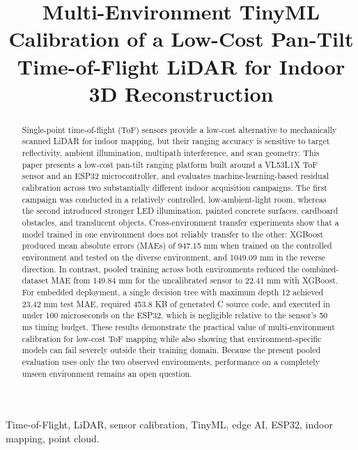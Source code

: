 \documentclass[conference, a4paper]{IEEEtran}
\begin{document}
\title{Multi-Environment TinyML Calibration of a Low-Cost Pan-Tilt Time-of-Flight LiDAR for Indoor 3D Reconstruction}

\author{
}

\maketitle

\begin{abstract}
Single-point time-of-flight (ToF) sensors provide a low-cost alternative to mechanically scanned LiDAR for indoor mapping, but their ranging accuracy is sensitive to target reflectivity, ambient illumination, multipath interference, and scan geometry. This paper presents a low-cost pan-tilt ranging platform built around a VL53L1X ToF sensor and an ESP32 microcontroller, and evaluates machine-learning-based residual calibration across two substantially different indoor acquisition campaigns. The first campaign was conducted in a relatively controlled, low-ambient-light room, whereas the second introduced stronger LED illumination, painted concrete surfaces, cardboard obstacles, and translucent objects. Cross-environment transfer experiments show that a model trained in one environment does not reliably transfer to the other: XGBoost produced mean absolute errors (MAEs) of 947.15 mm when trained on the controlled environment and tested on the diverse environment, and 1049.09 mm in the reverse direction. In contrast, pooled training across both environments reduced the combined-dataset MAE from 149.84 mm for the uncalibrated sensor to 22.41 mm with XGBoost. For embedded deployment, a single decision tree with maximum depth 12 achieved 23.42 mm test MAE, required 453.8 KB of generated C source code, and executed in under 100 microseconds on the ESP32, which is negligible relative to the sensor's 50 ms timing budget. These results demonstrate the practical value of multi-environment calibration for low-cost ToF mapping while also showing that environment-specific models can fail severely outside their training domain. Because the present pooled evaluation uses only the two observed environments, performance on a completely unseen environment remains an open question.
\end{abstract}

\begin{IEEEkeywords}
Time-of-Flight, LiDAR, sensor calibration, TinyML, edge AI, ESP32, indoor mapping, point cloud.
\end{IEEEkeywords}
\end{document}
